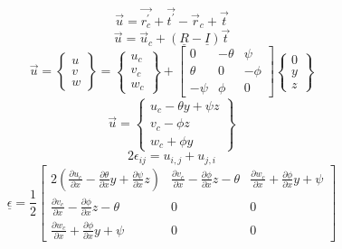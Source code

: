 \begin{equation}\label{eq:DispVectorrptprt}
\vec{u}=\vec{r_c^\prime}+\vec{t^\prime}-\vec{r}_c+\vec{t}
\end{equation}
\begin{equation}\label{eq:DispVectRotTranst}
\vec{u}=\vec{u}_c+(\underline{R}-\underline{I})\vec{t}
\end{equation}
\begin{equation}\label{DispVectExpanded}
\vec{u} = \left\{\begin{array}{c}
	u\\
	v\\
	w\end{array}\right\}=\left\{\begin{array}{c}
	u_c\\
	v_c\\
	w_c\end{array}\right\}+\left[\begin{array}{ccc}
	0&-\theta&\psi\\
	\theta&0&-\phi\\
	-\psi&\phi&0
	\end{array}\right]\left\{\begin{array}{c}
	0\\
	y\\
	z\end{array}\right\}
\end{equation}
\begin{equation}\label{eq:DispVectEvaluated}
\vec{u}=\left\{\begin{array}{c}
u_c-\theta y+\psi z\\
v_c-\phi z\\
w_c+\phi y\end{array}\right\}
\end{equation}
\begin{equation}\label{eq:LinearStrainDispRelationship}
2\epsilon_{ij}=u_{i,j}+u_{j,i}
\end{equation}
\begin{equation}\label{eq:StrainEvaluated}
\underline{\epsilon}=\frac{1}{2}\left[\begin{array}{ccc}
2\left(\frac{\partial u_c}{\partial x}-\frac{\partial\theta}{\partial x}y+\frac{\partial\psi}{\partial x}z\right) & \frac{\partial v_c}{\partial x}-\frac{\partial\phi}{\partial x}z-\theta & \frac{\partial w_c}{\partial x}+\frac{\partial \phi}{\partial x}y+\psi\\
\frac{\partial v_c}{\partial x}-\frac{\partial\phi}{\partial x}z-\theta &0&0\\
\frac{\partial w_c}{\partial x}+\frac{\partial \phi}{\partial x}y+\psi&0&0\end{array}\right]
\end{equation}
